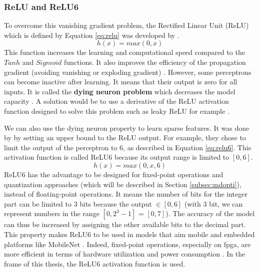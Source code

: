 \subsubsection{ReLU and ReLU6}
To overcome this vanishing gradient problem, the Rectified Linear Unit (ReLU) which is defined by Equation \eqref{eq:relu} was developed by \textcite{krizhevsky_imagenet_2012}.
%
\begin{equation}
    h(x) = max(0, x)
    \label{eq:relu}
\end{equation}
%
This function increases the learning and computational speed compared to the $Tanh$ and $Sigmoid$ functions. It also improves the efficiency of the propagation gradient (avoiding vanishing or exploding gradient) \cite{abdelouahab_accelerating_2018, maas_rectier_2013}. However, some perceptrons can become inactive after learning. It means that their output is zero for all inputs. It is called the \textbf{dying neuron problem} which decreases the model capacity \cite{matteucci_artificial_2019}. A solution would be to use a derivative of the ReLU activation function designed to solve this problem such as leaky ReLU for example \cite{matteucci_artificial_2019, maas_rectier_2013}.

We can also use the dying neuron property to learn sparse features. It was done by \textcite{krizhevsky_convolutional_2010} by setting an upper bound to the ReLU output. For example, they chose to limit the output of the perceptron to 6, as described in Equation \eqref{eq:relu6}. This activation function is called ReLU6 because its output range is limited to $[0, 6]$. 
%
\begin{equation}
    h(x) = max(0, x, 6)
    \label{eq:relu6}
\end{equation}
%
ReLU6 has the advantage to be designed for fixed-point operations and quantization approaches (which will be described in Section \ref{subsec:mdopti}), instead of floating-point operations. It means the number of bits for the integer part can be limited to 3 bits because the output $ \in [0, 6]$ (with 3 bit, we can represent numbers in the range $[0, 2^3-1]$ = $[0, 7]$). The accuracy of the model can thus be increased by assigning the other available bits to the decimal part. This property makes ReLU6 to be used in models that aim mobile and embedded platforms like MobileNet \cite{howard_mobilenets_2017}. Indeed, fixed-point operations, especially on \acrshort{fpga}, are more efficient in terms of hardware utilization and power consumption \cite{david_hardware_2007}. In the frame of this thesis, the ReLU6 activation function is used.

